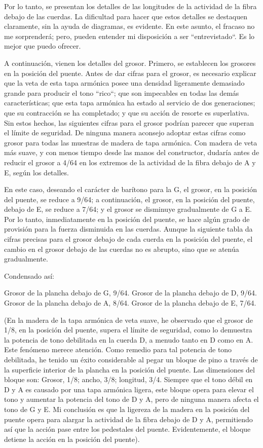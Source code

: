 \documentclass[12pt]{book}
\begin{document}
Por lo tanto, se presentan los detalles de las longitudes de la actividad de la fibra debajo de las cuerdas. La dificultad para hacer que estos detalles se destaquen claramente, sin la ayuda de diagramas, es evidente. En este asunto, el fracaso no me sorprenderá; pero, pueden entender mi disposición a ser ``entrevistado``. Es lo mejor que puedo ofrecer.

A continuación, vienen los detalles del grosor. Primero, se establecen los grosores en la posición del puente. Antes de dar cifras para el grosor, es necesario explicar que la veta de esta tapa armónica posee una densidad ligeramente demasiado grande para producir el tono ``rico``; que son impecables en todas las demás características; que esta tapa armónica ha estado al servicio de dos generaciones; que su contracción se ha completado; y que su acción de resorte es superlativa. Sin estos hechos, las siguientes cifras para el grosor podrían parecer que superan el límite de seguridad. De ninguna manera aconsejo adoptar estas cifras como grosor para todas las muestras de madera de tapa armónica. Con madera de veta más suave, y con menos tiempo desde las manos del constructor, dudaría antes de reducir el grosor a 4/64 en los extremos de la actividad de la fibra debajo de A y E, según los detalles.

En este caso, deseando el carácter de barítono para la G, el grosor, en la posición del puente, se reduce a 9/64; a continuación, el grosor, en la posición del puente, debajo de E, se reduce a 7/64; y el grosor se disminuye gradualmente de G a E. Por lo tanto, inmediatamente en la posición del puente, se hace algún grado de provisión para la fuerza disminuida en las cuerdas. Aunque la siguiente tabla da cifras precisas para el grosor debajo de cada cuerda en la posición del puente, el cambio en el grosor debajo de las cuerdas no es abrupto, sino que se atenúa gradualmente.

Condensado así:

Grosor de la plancha debajo de G, 9/64. Grosor de la plancha debajo de D, 9/64. Grosor de la plancha debajo de A, 8/64. Grosor de la plancha debajo de E, 7/64.

(En la madera de la tapa armónica de veta suave, he observado que el grosor de 1/8, en la posición del puente, supera el límite de seguridad, como lo demuestra la potencia de tono debilitada en la cuerda D, a menudo tanto en D como en A. Este fenómeno merece atención. Como remedio para tal potencia de tono debilitada, he tenido un éxito considerable al pegar un bloque de pino a través de la superficie interior de la plancha en la posición del puente. Las dimensiones del bloque son: Grosor, 1/8; ancho, 3/8; longitud, 3/4. Siempre que el tono débil en D y A es causado por una tapa armónica ligera, este bloque opera para elevar el tono y aumentar la potencia del tono de D y A, pero de ninguna manera afecta el tono de G y E. Mi conclusión es que la ligereza de la madera en la posición del puente opera para alargar la actividad de la fibra debajo de D y A, permitiendo así que la acción pase entre los pedestales del puente. Evidentemente, el bloque detiene la acción en la posición del puente).
\end{document}

